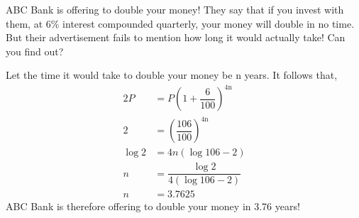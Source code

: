
%
%
%
%
% 

\question[2] ABC Bank is offering to double your money! They say that if you invest with them, at 6\% interest compounded quarterly, your money will double in no time. But their advertisement fails to mention how long it would actually take! Can you find out?

\ifprintanswers
\fi 

\begin{solution}
	Let the time it would take to double your money be n years. It follows that,
	\begin{align}
			2P &= P\left(1+\dfrac{6}{100}\right)^\text{4n} \\
		 	 2 &= \left(\dfrac{106}{100}\right)^\text{4n} \\
		\log 2 &= 4n\left(\log 106 -2\right) \\
			 n &= \dfrac{\log 2}{4\left(\log 106 -2\right)} \\
			 n &= 3.7625
	\end{align}
	ABC Bank is therefore offering to double your money in 3.76 years!
\end{solution}
